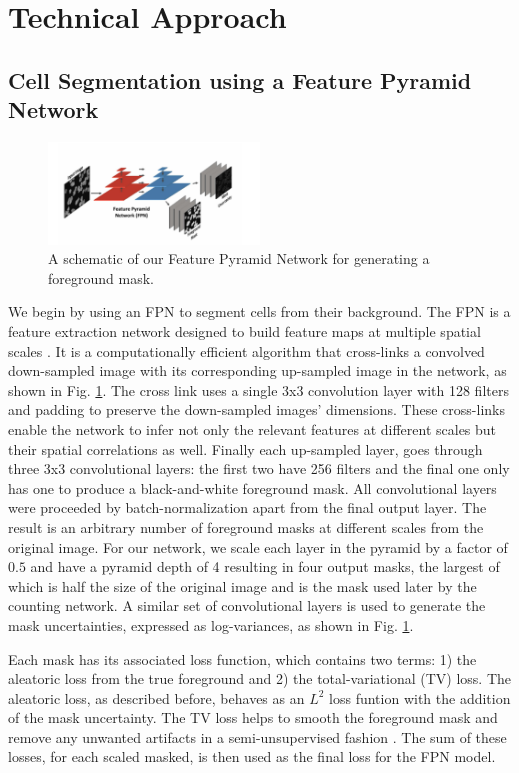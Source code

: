\documentclass[10pt,twocolumn,letterpaper]{article}
\begin{document}
\section{Technical Approach}
\subsection{Cell Segmentation using a Feature Pyramid Network}

\begin{figure}[!h]
\centering
\includegraphics[width=0.5\textwidth]{fpn}
\caption{A schematic of our Feature Pyramid Network for generating a foreground mask.}
\label{fig1}
\end{figure}

We begin by using an FPN to segment cells from their background.
The FPN is a feature extraction network designed to build feature maps at multiple spatial scales \cite{fpn2016}.
It is a computationally efficient algorithm that cross-links a convolved down-sampled image with its corresponding up-sampled image in the network, as shown in Fig. \ref{fig1}. The cross link uses a single 3x3 convolution layer with 128 filters and padding to preserve the down-sampled images' dimensions. 
These cross-links enable the network to infer not only the relevant features at different scales but their spatial correlations as well.
Finally each up-sampled layer, goes through three 3x3 convolutional layers: the first two have 256 filters and the final one only has one to produce a black-and-white foreground mask.
All convolutional layers were proceeded by batch-normalization apart from the final output layer. The result is an arbitrary number of foreground masks at different scales from the original image.
For our network, we scale each layer in the pyramid by a factor of $0.5$ and have a pyramid depth of 4 resulting in four output masks, the largest of which is half the size of the original image and is the mask used later by the counting network.
A similar set of convolutional layers is used to generate the mask uncertainties, expressed as log-variances, as shown in Fig. \ref{fig1}.

Each mask has its associated loss function, which contains two terms: 1) the aleatoric loss from the true foreground and 2) the total-variational (TV) loss. The aleatoric loss, as described before, behaves as an $L^2$ loss funtion with the addition of the mask uncertainty. The TV loss helps to smooth the foreground mask and remove any unwanted artifacts in a semi-unsupervised fashion \cite{tvloss}. The sum of these losses, for each scaled masked, is then used as the final loss for the FPN model.
\end{document}
